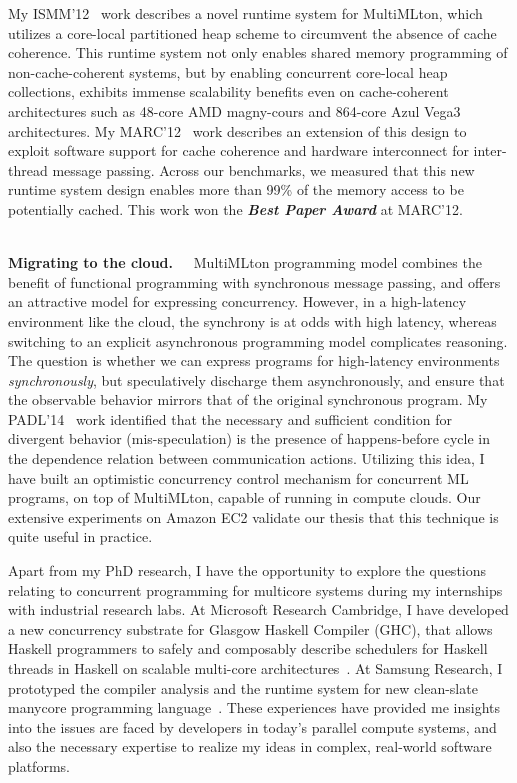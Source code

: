 \documentclass{article}
\newcommand{\loud}[1]{\textbf{\textit{#1}}}
\newcommand{\R}[1]{~\\[-2mm] \noindent \textbf{#1.~~}}
\begin{document}
My ISMM'12~\cite{mmgc} work describes a novel runtime system for MultiMLton,
which utilizes a core-local partitioned heap scheme to circumvent the absence
of cache coherence. This runtime system not only enables shared memory
programming of non-cache-coherent systems, but by enabling concurrent
core-local heap collections, exhibits immense scalability benefits even on
cache-coherent architectures such as 48-core AMD magny-cours and 864-core Azul
Vega3 architectures. My MARC'12~\cite{KC_MARC12} work describes an extension of
this design to exploit software support for cache coherence and hardware
interconnect for inter-thread message passing. Across our benchmarks, we
measured that this new runtime system design enables more than 99\% of the
memory access to be potentially cached. This work won the \loud{Best Paper
Award} at MARC'12.

\R{Migrating to the cloud} MultiMLton programming model combines the
benefit of functional programming with synchronous message passing, and offers
an attractive model for expressing concurrency. However, in a high-latency
environment like the cloud, the synchrony is at odds with high latency, whereas
switching to an explicit asynchronous programming model complicates reasoning.
The question is whether we can express programs for high-latency environments
\emph{synchronously}, but speculatively discharge them asynchronously, and
ensure that the observable behavior mirrors that of the original synchronous
program. My PADL'14~\cite{RxCML} work identified that the necessary and
sufficient condition for divergent behavior (mis-speculation) is the presence
of happens-before cycle in the dependence relation between communication
actions. Utilizing this idea, I have built an optimistic concurrency control
mechanism for concurrent ML programs, on top of MultiMLton, capable of running
in compute clouds. Our extensive experiments on Amazon EC2 validate our thesis
that this technique is quite useful in practice.

Apart from my PhD research, I have the opportunity to explore the questions
relating to concurrent programming for multicore systems during my internships
with industrial research labs. At Microsoft Research Cambridge, I have
developed a new concurrency substrate for Glasgow Haskell Compiler (GHC), that
allows Haskell programmers to safely and composably describe schedulers for
Haskell threads in Haskell on scalable multi-core architectures~\cite{CompSA}.
At Samsung Research, I prototyped the compiler analysis and the runtime system
for new clean-slate manycore programming language~\cite{SPARTA}. These
experiences have provided me insights into the issues are faced by developers
in today's parallel compute systems, and also the necessary expertise to
realize my ideas in complex, real-world software platforms.
\end{document}
